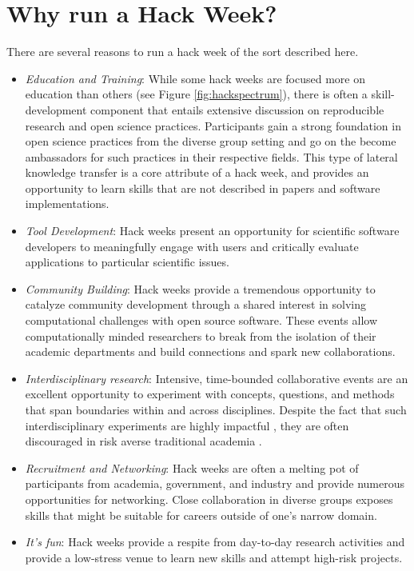 \section*{Why run a Hack Week?}

There are several reasons to run a hack week of the sort described here.

\begin{itemize}
\item{\textit{Education and Training}: 
While some hack weeks are focused more on education than others (see Figure \ref{fig:hackspectrum}), there is often a skill-development component that entails extensive discussion on reproducible research and open science practices. Participants gain a strong foundation in open science practices from the diverse group setting and go on the become ambassadors for such practices in their respective fields. This type of lateral knowledge transfer is a core attribute of a hack week, and provides an opportunity to learn skills that are not described in papers and software implementations.}

\item{\textit{Tool Development}: Hack weeks present an opportunity for scientific software developers to meaningfully engage with users and critically evaluate applications to particular scientific issues.}

\item{\textit{Community Building}: Hack weeks provide a tremendous opportunity to catalyze community development through a shared interest in solving computational challenges with open source software. These events allow computationally minded researchers to break from the isolation of their academic departments and build connections and spark new collaborations.}


\item{\textit{Interdisciplinary research}: Intensive, time-bounded collaborative events are an excellent opportunity to experiment with concepts, questions, and methods that span boundaries within and across disciplines. Despite the fact that such interdisciplinary experiments are highly impactful \cite{Hall2012-hi}, they are often discouraged in risk averse traditional academia \cite{Sung2003-go, Rhoten2004-fk}}.

\item{\textit{Recruitment and Networking}: Hack weeks are often a melting pot of participants from academia, government, and industry and provide numerous opportunities for networking. Close collaboration in diverse groups exposes skills that might be suitable for careers outside of one's narrow domain.}

\item{\textit{It's fun}: Hack weeks provide a respite from day-to-day research activities and provide a low-stress venue to learn new skills and attempt high-risk projects.}

\end{itemize}


